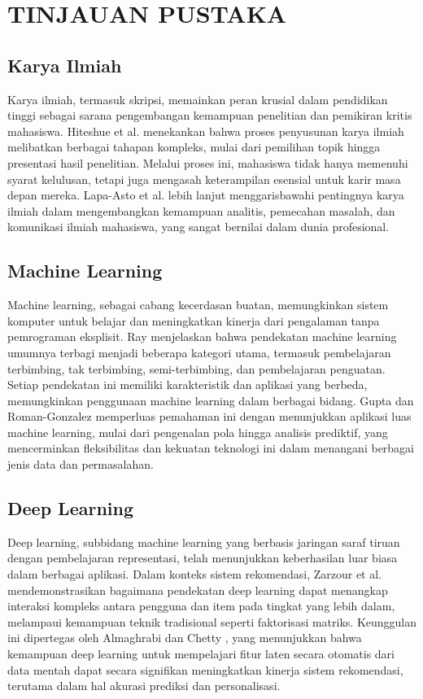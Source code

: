 \chapter{TINJAUAN PUSTAKA}

\section{Karya Ilmiah}
Karya ilmiah, termasuk skripsi, memainkan peran krusial dalam pendidikan tinggi sebagai sarana pengembangan kemampuan penelitian dan pemikiran kritis mahasiswa. Hiteshue et al. \cite{hiteshue2015interdisciplinary} menekankan bahwa proses penyusunan karya ilmiah melibatkan berbagai tahapan kompleks, mulai dari pemilihan topik hingga presentasi hasil penelitian. Melalui proses ini, mahasiswa tidak hanya memenuhi syarat kelulusan, tetapi juga mengasah keterampilan esensial untuk karir masa depan mereka. Lapa-Asto et al. \cite{lapa2019impact} lebih lanjut menggarisbawahi pentingnya karya ilmiah dalam mengembangkan kemampuan analitis, pemecahan masalah, dan komunikasi ilmiah mahasiswa, yang sangat bernilai dalam dunia profesional.

\section{Machine Learning}
Machine learning, sebagai cabang kecerdasan buatan, memungkinkan sistem komputer untuk belajar dan meningkatkan kinerja dari pengalaman tanpa pemrograman eksplisit. Ray \cite{ray2019quick} menjelaskan bahwa pendekatan machine learning umumnya terbagi menjadi beberapa kategori utama, termasuk pembelajaran terbimbing, tak terbimbing, semi-terbimbing, dan pembelajaran penguatan. Setiap pendekatan ini memiliki karakteristik dan aplikasi yang berbeda, memungkinkan penggunaan machine learning dalam berbagai bidang. Gupta dan Roman-Gonzalez \cite{gupta2020survey} memperluas pemahaman ini dengan menunjukkan aplikasi luas machine learning, mulai dari pengenalan pola hingga analisis prediktif, yang mencerminkan fleksibilitas dan kekuatan teknologi ini dalam menangani berbagai jenis data dan permasalahan.

\section{Deep Learning}
Deep learning, subbidang machine learning yang berbasis jaringan saraf tiruan dengan pembelajaran representasi, telah menunjukkan keberhasilan luar biasa dalam berbagai aplikasi. Dalam konteks sistem rekomendasi, Zarzour et al. \cite{zarzour2019recdnning} mendemonstrasikan bagaimana pendekatan deep learning dapat menangkap interaksi kompleks antara pengguna dan item pada tingkat yang lebih dalam, melampaui kemampuan teknik tradisional seperti faktorisasi matriks. Keunggulan ini dipertegas oleh Almaghrabi dan Chetty \cite{almaghrabi2018deep}, yang menunjukkan bahwa kemampuan deep learning untuk mempelajari fitur laten secara otomatis dari data mentah dapat secara signifikan meningkatkan kinerja sistem rekomendasi, terutama dalam hal akurasi prediksi dan personalisasi.

